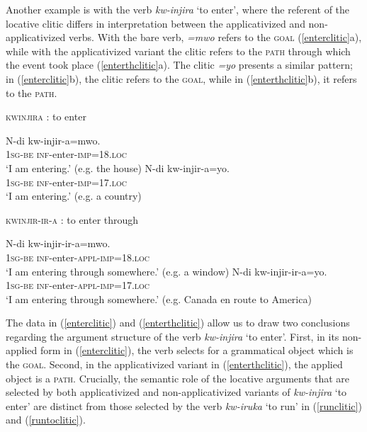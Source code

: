 \documentclass[output=paper]{langsci/langscibook}
\begin{document}
Another example is with the verb \emph{kw-injira} `to enter', where the referent of the locative clitic differs in interpretation between the applicativized and non-applicativized verbs. With the bare verb, \emph{=mwo} refers to the {\scshape goal} (\ref{enterclitic}a), while with the applicativized variant the clitic refers to the {\scshape path} through which the event took place (\ref{enterthclitic}a). The clitic \emph{=yo} presents a similar pattern; in (\ref{enterclitic}b), the clitic refers to the {\scshape goal}, while in (\ref{enterthclitic}b), it refers to the {\scshape path}.


\begin{exe}
      \ex\label{enterclitic} {\scshape kwinjira} : to enter \begin{xlist}
	      \ex\gll N-di kw-injir-a=mwo.\\
			      1{\scshape sg-be} {\scshape inf-}enter-{\scshape imp=18.loc}\\
			      \glt `I am entering.' (e.g. the house)
	      \ex\gll N-di kw-injir-a=yo.\\
			      1{\scshape sg-be} {\scshape inf-}enter-{\scshape imp=17.loc}\\
			      \glt `I am entering.' (e.g. a country)
      \end{xlist}
      \ex\label{enterthclitic} {\scshape kwinjir-ir-a} : to enter through \begin{xlist}
	      \ex\gll N-di kw-injir-ir-a=mwo.\\
			      1{\scshape sg-be} {\scshape inf-}enter-{\scshape appl-imp=18.loc}\\
			      \glt `I am entering through somewhere.' (e.g. a window)
	      \ex\gll N-di kw-injir-ir-a=yo.\\
			      1{\scshape sg-be} {\scshape inf-}enter-{\scshape appl-imp=17.loc}\\
			      \glt `I am entering through somewhere.' (e.g. Canada en route to America)
	      \end{xlist}
	      \end{exe}
%
The data in (\ref{enterclitic}) and (\ref{enterthclitic}) allow us to draw two conclusions regarding the argument structure of the verb \emph{kw-injira} `to enter'. First, in its non-applied form in (\ref{enterclitic}), the verb selects for a grammatical object which is the {\scshape goal}. Second, in the applicativized variant in (\ref{enterthclitic}), the applied object is a {\scshape path}. Crucially, the semantic role of the locative arguments that are selected by both applicativized and  non-applicativized variants of \emph{kw-injira} `to enter' are distinct from those selected by the verb \emph{kw-iruka} `to run' in (\ref{runclitic}) and (\ref{runtoclitic}). 
\end{document}
